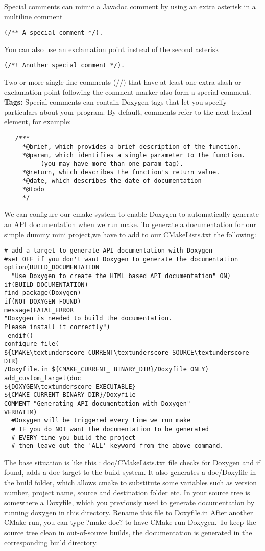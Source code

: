 \documentclass[11pt,utf8]{article}
\begin{document}
Special comments can mimic a Javadoc comment by using an extra asterisk in a multiline comment
\begin{lstlisting}
(/** A special comment */).
\end{lstlisting}
You can also use an exclamation point instead of the second asterisk
\begin{lstlisting}
(/*! Another special comment */).
\end{lstlisting}
Two or more single line comments (//) that have at least one extra slash or exclamation point following the comment marker also form a special comment.
\textbf{Tags:}
Special comments can contain Doxygen tags that let you specify particulars about your program. By default, comments refer to the next lexical element, for example:
\begin{lstlisting}
   /***
     *@brief, which provides a brief description of the function.
     *@param, which identifies a single parameter to the function.
          (you may have more than one param tag).
     *@return, which describes the function's return value.
     *@date, which describes the date of documentation
     *@todo
     */
 \end{lstlisting}
We can configure our cmake system to enable Doxygen to automatically generate an API documentation when we run make.
To generate a documentation for our simple \href{https://github.com/wkyoshe/stageM1/tree/master/src}{dummy mini project},we have to add to our CMakeLists.txt the following:
\begin{lstlisting}
# add a target to generate API documentation with Doxygen
#set OFF if you don't want Doxygen to generate the documentation
option(BUILD_DOCUMENTATION 
  "Use Doxygen to create the HTML based API documentation" ON)
if(BUILD_DOCUMENTATION)
find_package(Doxygen)
if(NOT DOXYGEN_FOUND)
message(FATAL_ERROR
"Doxygen is needed to build the documentation. 
Please install it correctly")
 endif()
configure_file(
${CMAKE\textunderscore CURRENT\textunderscore SOURCE\textunderscore DIR}
/Doxyfile.in ${CMAKE_CURRENT_ BINARY_DIR}/Doxyfile ONLY)
add_custom_target(doc
${DOXYGEN\textunderscore EXECUTABLE} 
${CMAKE_CURRENT_BINARY_DIR}/Doxyfile
COMMENT "Generating API documentation with Doxygen" 
VERBATIM)
  #Doxygen will be triggered every time we run make
  # IF you do NOT want the documentation to be generated
  # EVERY time you build the project
  # then leave out the 'ALL' keyword from the above command.                
\end{lstlisting}
The base situation is like this : doc/CMakeLists.txt file checks for Doxygen and if found, adds a doc target to the build system. It also generates a doc/Doxyfile in the build folder, which allows cmake to substitute some variables such as version number, project name, source and destination folder etc. In your source tree is somewhere a Doxyfile, which you previously used to generate documentation by running doxygen in this directory. Rename this file to Doxyfile.in
After another CMake run, you can type ?make doc? to have CMake run Doxygen. To keep the source tree clean in out-of-source builds, the documentation is generated in the corresponding build directory.
\end{document}
